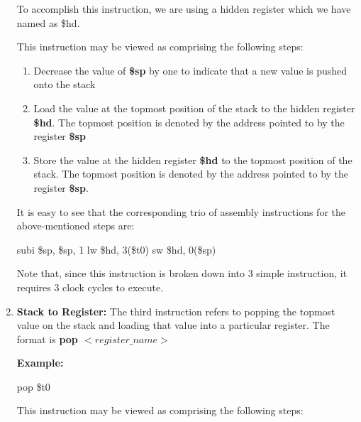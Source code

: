 \documentclass{article}
\begin{document}
\begin{enumerate}
			To accomplish this instruction, we are using a hidden register which we have named as \$hd.
			
			This instruction may be viewed as comprising the following steps:
			
			\begin{enumerate}
				\item Decrease the value of \textbf{\$sp} by one to indicate that a new value is pushed onto the stack
				
				\item Load the value at the topmost position of the stack to the hidden register \textbf{\$hd}. The topmost position is denoted by the address pointed to by the register \textbf{\$sp}
				
				\item Store the value at the hidden register \textbf{\$hd} to the topmost position of the stack. The topmost position is denoted by the address pointed to by the register \textbf{\$sp}.
				
			\end{enumerate}
			
			It is easy to see that the corresponding trio of assembly instructions for the above-mentioned steps are:
			
				subi \$sp, \$sp, 1
				lw \$hd, 3(\$t0)
				sw \$hd, 0(\$sp) 
			
			Note that, since this instruction is broken down into 3 simple instruction, it requires 3 clock cycles to execute.
			
			\vspace{3mm}
			
			
			
			
			\item \textbf{Stack to Register: } The third instruction refers to popping the topmost value on the stack and loading that value into a particular register. The format is \textbf{pop \hspace{.5mm} $<register\_name>$}
			
			\textbf{Example:} 
			
				pop \$t0
			
			This instruction may be viewed as comprising the following steps:
			

\end{enumerate}
\end{document}
